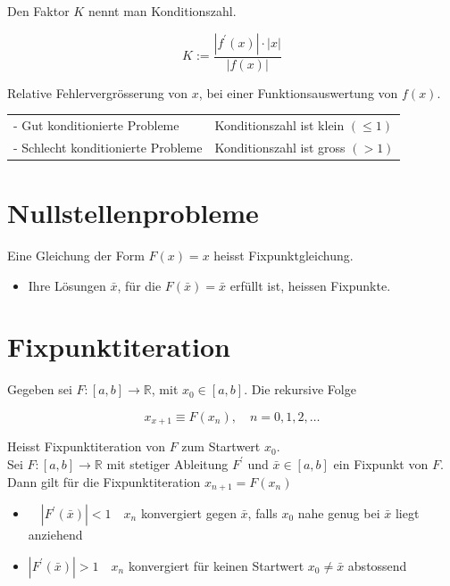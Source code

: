 \documentclass[10pt]{article}
\begin{document}
Den Faktor $K$ nennt man Konditionszahl.

$$
K:=\frac{\left|f^{\prime}(x)\right| \cdot|x|}{|f(x)|}
$$

Relative Fehlervergrösserung von $x$, bei einer Funktionsauswertung von $f(x)$.

\begin{center}
\begin{tabular}{ll}
- Gut konditionierte Probleme & Konditionszahl ist klein $(\leq 1)$ \\
- Schlecht konditionierte Probleme & Konditionszahl ist gross $(>1)$ \\
\end{tabular}
\end{center}

\section*{Nullstellenprobleme}
Eine Gleichung der Form $F(x)=x$ heisst Fixpunktgleichung.

\begin{itemize}
  \item Ihre Lösungen $\bar{x}$, für die $F(\bar{x})=\bar{x}$ erfüllt ist, heissen Fixpunkte.
\end{itemize}

\section*{Fixpunktiteration}
Gegeben sei $F:[a, b] \rightarrow \mathbb{R}$, mit $x_{0} \in[a, b]$. Die rekursive Folge

$$
x_{x+1} \equiv F\left(x_{n}\right), \quad n=0,1,2, \ldots
$$

Heisst Fixpunktiteration von $F$ zum Startwert $x_{0}$.\\
Sei $F:[a, b] \rightarrow \mathbb{R}$ mit stetiger Ableitung $F^{\prime}$ und $\bar{x} \in[a, b]$ ein Fixpunkt von $F$. Dann gilt für die Fixpunktiteration $x_{n+1}=F\left(x_{n}\right)$

\begin{itemize}
  \item $\quad\left|F^{\prime}(\bar{x})\right|<1 \quad x_{n}$ konvergiert gegen $\bar{x}$, falls $x_{0}$ nahe genug bei $\bar{x}$ liegt anziehend
  \item $\left|F^{\prime}(\bar{x})\right|>1 \quad x_{n}$ konvergiert für keinen Startwert $x_{0} \neq \bar{x}$ abstossend
\end{itemize}
\end{document}
